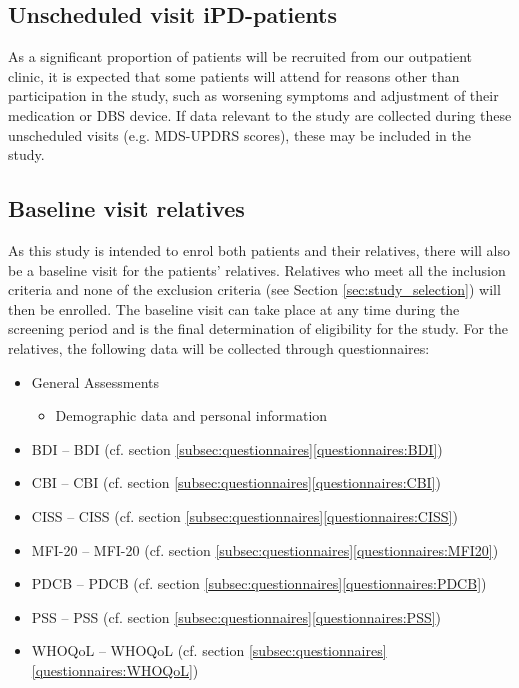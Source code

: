 \subsection{Unscheduled visit \ac{iPD}-patients}
As a significant proportion of patients will be recruited from our outpatient clinic, it is expected that some patients will attend for reasons other than participation in the study, such as worsening symptoms and adjustment of their medication or \ac{DBS} device. If data relevant to the study are collected during these unscheduled visits (e.g. \ac{MDS-UPDRS} scores), these may be included in the study.
 
\subsection{Baseline visit relatives}
As this study is intended to enrol both patients and their relatives, there will also be a baseline visit for the patients' relatives. Relatives who meet all the inclusion criteria and none of the exclusion criteria (see Section \ref{sec:study_selection}) will then be enrolled. The baseline visit can take place at any time during the screening period and is the final determination of eligibility for the study. For the relatives, the following data will be collected through questionnaires:

\begin{itemize}[noitemsep,topsep=0pt]
\item General Assessments
\begin{itemize}[noitemsep,topsep=0pt]
\item Demographic data and personal information
\end{itemize}
\item \acl{BDI} -- \acs{BDI} (cf. section \ref{subsec:questionnaires}\ref{questionnaires:BDI})
\item \acl{CBI} -- \acs{CBI} (cf. section \ref{subsec:questionnaires}\ref{questionnaires:CBI})
\item \acl{CISS} -- \acs{CISS} (cf. section \ref{subsec:questionnaires}\ref{questionnaires:CISS})
\item \acl{MFI-20} -- \acs{MFI-20} (cf. section \ref{subsec:questionnaires}\ref{questionnaires:MFI20})
\item \acl{PDCB} -- \acs{PDCB} (cf. section \ref{subsec:questionnaires}\ref{questionnaires:PDCB})
\item \acl{PSS} -- \acs{PSS} (cf. section \ref{subsec:questionnaires}\ref{questionnaires:PSS})
\item \acl{WHOQoL} -- \acs{WHOQoL} (cf. section \ref{subsec:questionnaires}\ref{questionnaires:WHOQoL})
\end{itemize}


